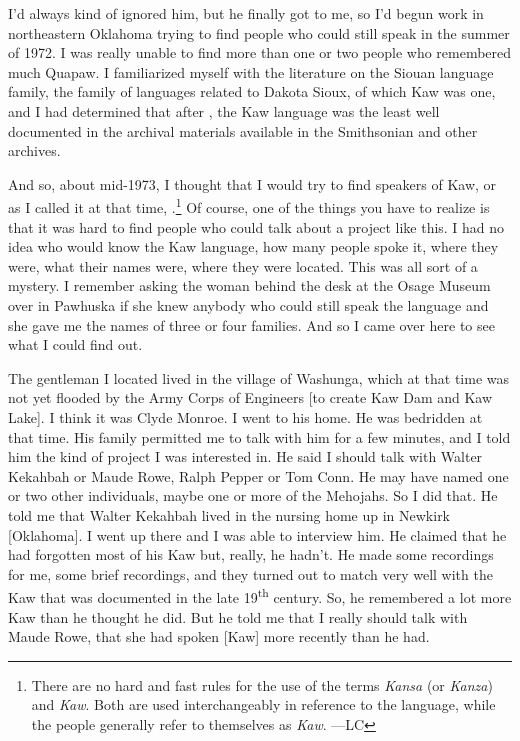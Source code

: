 \documentclass[output=paper]{LSP/langsci}
\begin{document}
I'd always kind of ignored him, but he finally got to me, so I'd begun work in northeastern Oklahoma trying to find people who could still speak  in the summer of 1972. I was really unable to find more than one or two people who remembered much Quapaw. I familiarized myself with the literature on the Siouan language family, the family of languages related to Dakota Sioux, of which Kaw was one, and I had determined that after , the Kaw language was the least well documented in the archival materials available in the Smithsonian and other archives. 

And so, about mid-1973, I thought that I would try to find speakers of Kaw, or as I called it at that time, .\footnote{There are no hard and fast rules for the use of the terms \textit{Kansa} (or \textit{Kanza}) and \textit{Kaw}. Both are used interchangeably in reference to the language, while the people generally refer to themselves as \textit{Kaw}. ---LC} Of course, one of the things you have to realize is that it was hard to find people who could talk about a project like this. I had no idea who would know the Kaw language, how many people spoke it, where they were, what their names were, where they were located. This was all sort of a mystery. I remember asking the woman behind the desk at the Osage Museum over in Pawhuska if she knew anybody who could still speak the  language and she gave me the names of three or four families. And so I came over here to see what I could find out. 

The gentleman I located lived in the village of Washunga, which at that time was not yet flooded by the Army Corps of Engineers [to create Kaw Dam and Kaw Lake]. I think it was Clyde Monroe. I went to his home. He was bedridden at that time. His family permitted me to talk with him for a few minutes, and I told him the kind of project I was interested in. He said I should talk with Walter Kekahbah or Maude Rowe, Ralph Pepper or Tom Conn. He may have named one or two other individuals, maybe one or more of the Mehojahs. So I did that. He told me that Walter Kekahbah lived in the nursing home up in Newkirk [Oklahoma]. I went up there and I was able to interview him. He claimed that he had forgotten most of his Kaw but, really, he hadn't. He made some recordings for me, some brief recordings, and they turned out to match very well with the Kaw that was documented in the late 19\textsuperscript{th} century. So, he remembered a lot more Kaw than he thought he did. But he told me that I really should talk with Maude Rowe, that she had spoken [Kaw] more recently than he had. 
\end{document}
